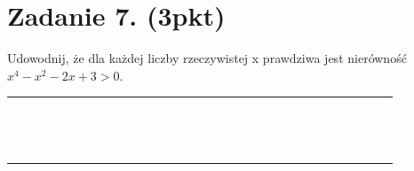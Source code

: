 \documentclass[10pt]{article}
\begin{document}
\section*{Zadanie 7. (3pkt)}
Udowodnij, że dla każdej liczby rzeczywistej x prawdziwa jest nierówność \(x^{4}-x^{2}-2 x+3>0\).

\begin{center}
\begin{tabular}{|c|c|c|c|c|c|c|c|c|c|c|c|c|c|c|c|c|c|c|c|c|c|c|c|c|c|c|c|c|c|c|}
\hline
 &  &  &  &  &  &  &  &  &  &  &  &  &  &  &  &  &  &  &  &  &  &  &  &  &  &  &  &  &  &  \\
\hline
 &  &  &  &  &  &  &  &  &  &  &  &  &  &  &  &  &  &  &  &  &  &  &  &  &  &  &  &  &  &  \\
\hline
 &  &  &  &  &  &  &  &  &  &  &  &  &  &  &  &  &  &  &  &  &  &  &  &  &  &  &  &  &  &  \\
\hline
 &  &  &  &  &  &  &  &  &  &  &  &  &  &  &  &  &  &  &  &  &  &  &  &  &  &  &  &  &  &  \\
\hline
 &  &  &  &  &  &  &  &  &  &  &  &  &  &  &  &  &  &  &  &  &  &  &  &  &  &  &  &  &  &  \\
\hline
 &  &  &  &  &  &  &  &  &  &  &  &  &  &  &  &  &  &  &  &  &  &  &  &  &  &  &  &  &  &  \\
\hline
 &  &  &  &  &  &  &  &  &  &  &  &  &  &  &  &  &  &  &  &  &  &  &  &  &  &  &  &  &  &  \\
\hline
 &  &  &  &  &  &  &  &  &  &  &  &  &  &  &  &  &  &  &  &  &  &  &  &  &  &  &  &  &  &  \\
\hline
 &  &  &  &  &  &  &  &  &  &  &  &  &  &  &  &  &  &  &  &  &  &  &  &  &  &  &  &  &  &  \\
\hline
 &  &  &  &  &  &  &  &  &  &  &  &  &  &  &  &  &  &  &  &  &  &  &  &  &  &  &  &  &  &  \\
\hline
 &  &  &  &  &  &  &  &  &  &  &  &  &  &  &  &  &  &  &  &  &  &  &  &  &  &  &  &  &  &  \\
\hline
 &  &  &  &  &  &  &  &  &  &  &  &  &  &  &  &  &  &  &  &  &  &  &  &  &  &  &  &  &  &  \\
\hline
 &  &  &  &  &  &  &  &  &  &  &  &  &  &  &  &  &  &  &  &  &  &  &  &  &  &  &  &  &  &  \\
\hline
 &  &  &  &  &  &  &  &  &  &  &  &  &  &  &  &  &  &  &  &  &  &  &  &  &  &  &  &  &  &  \\
\hline
 &  &  &  &  &  &  &  &  &  &  &  &  &  &  &  &  &  &  &  &  &  &  &  &  &  &  &  &  &  &  \\

\end{tabular}
\end{center}
\end{document}
